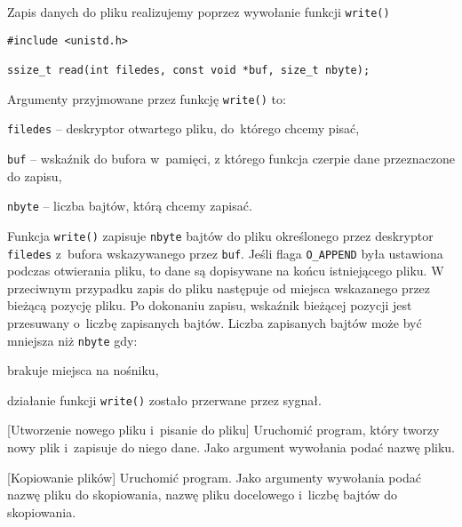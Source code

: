 Zapis danych do pliku realizujemy poprzez wywołanie funkcji \texttt{write()}
\begin{lstlisting}[style=MyCStyle]
#include <unistd.h>

ssize_t read(int filedes, const void *buf, size_t nbyte);
\end{lstlisting}
Argumenty przyjmowane przez funkcję \texttt{write()} to:
\begin{myitemize}
  \item \texttt{filedes} -- deskryptor otwartego pliku, do~którego chcemy pisać,
  \item \texttt{buf} -- wskaźnik do bufora w~pamięci, z którego funkcja czerpie
        dane przeznaczone do zapisu,
  \item \texttt{nbyte} -- liczba bajtów, którą chcemy zapisać.
\end{myitemize}
Funkcja \texttt{write()} zapisuje \texttt{nbyte} bajtów do pliku określonego
przez deskryptor \texttt{filedes} z~bufora wskazywanego przez \texttt{buf}.
Jeśli flaga \texttt{O\_APPEND} była ustawiona podczas otwierania pliku, to dane
są dopisywane na końcu istniejącego pliku. W przeciwnym przypadku zapis do
pliku następuje od miejsca wskazanego przez bieżącą pozycję pliku. Po dokonaniu
zapisu, wskaźnik bieżącej pozycji jest przesuwany o~liczbę zapisanych bajtów.
Liczba zapisanych bajtów może być mniejsza niż \texttt{nbyte} gdy:
\begin{myitemize}
  \item brakuje miejsca na nośniku,
  \item działanie funkcji \texttt{write()} zostało przerwane przez sygnał.
\end{myitemize}


\begin{example}{[Utworzenie nowego pliku i~pisanie do pliku]}
  Uruchomić program, który tworzy nowy plik i~zapisuje do niego dane. Jako
  argument wywołania podać nazwę pliku.
  
\end{example}

\begin{example}{[Kopiowanie plików]}
  Uruchomić program. Jako argumenty wywołania podać nazwę pliku do skopiowania,
  nazwę pliku docelowego i~liczbę bajtów do skopiowania.
  
\end{example}

